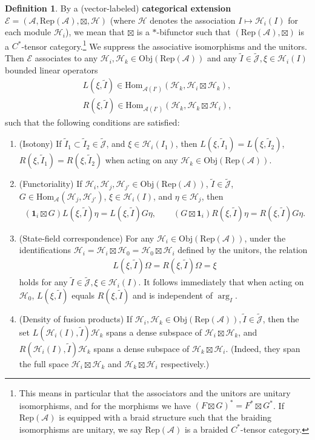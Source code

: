 \documentclass[12pt,a4paper,notitlepage]{article}
\theoremstyle{definition}
\newtheorem{df}{Definition}[section]
\theoremstyle{plain}
\newcommand{\fk}{\mathfrak}
\newcommand{\mc}{\mathcal}
\newcommand{\wtd}{\widetilde}
\newcommand{\id}{\mathbf{1}}
\newcommand{\Hom}{\mathrm{Hom}}
\newcommand{\Rep}{\mathrm{Rep}}
\newcommand{\scr}{\mathscr}
\newcommand{\Jtd}{\widetilde{\mathcal J}}
\newcommand{\RepA}{\mathrm{Rep}(\mathcal A)}
\newcommand{\Obj}{\mathrm{Obj}}
\numberwithin{equation}{section}
\begin{document}
\begin{df}\label{lb23}
By a (vector-labeled) \textbf{categorical extension} $\scr E=(\mc A,\Rep(\mc A),\boxtimes,\mc H)$ (where $\mc H$ denotes the association $I\mapsto \mc H_i(I)$ for each module $\mc H_i$), we mean that $\boxtimes$ is a $*$-bifunctor such that $(\RepA,\boxtimes)$ is a  $C^*$-tensor category.\footnote{This means in particular that the associators and the unitors are unitary isomorphisms, and for the morphisms we have $(F\boxtimes G)^*=F^*\boxtimes G^*$. If $\Rep(\mc A)$ is equipped with a braid structure such that the braiding isomorphisms are unitary, we say $\Rep(\mc A)$ is a braided $C^*$-tensor category.} We suppress the associative isomorphisms and the unitors.   Then $\scr E$ associates to any  $\mc H_i,\mc H_k\in\Obj(\Rep(\mc A))$ and any $\wtd I\in\Jtd,\fk \xi\in\mc H_i(I)$ bounded linear operators
\begin{gather*}
	L(\xi,\wtd I)\in\Hom_{\mc A(I')}(\mc H_k,\mc H_i\boxtimes\mc H_k),\\
	R(\xi,\wtd I)\in\Hom_{\mc A(I')}(\mc H_k,\mc H_k\boxtimes\mc H_i),
\end{gather*}
such that the following conditions are satisfied:
\begin{enumerate}[label=(\alph*)]
\item (Isotony) If $\wtd I_1\subset\wtd I_2\in\Jtd$, and $\xi\in\mc H_i(I_1)$, then $L(\xi,\wtd I_1)=L(\xi,\wtd I_2)$, $R(\xi,\wtd I_1)=R(\xi,\wtd I_2)$ when acting on any  $\mc H_k\in\Obj(\Rep(\mc A))$.
\item (Functoriality) If $\mc H_i,\mc H_j,\mc H_{j'}\in\Obj(\RepA)$, $\wtd I\in\Jtd$, $G\in\Hom_{\mc A}(\mc H_j,\mc H_{j'})$,  $\xi\in\mc H_i(I)$, and $\eta\in\mc H_j$, then
\begin{align}
	(\id_i\boxtimes G)L(\xi,\wtd I)\eta=L(\xi,\wtd I)G\eta,\qquad (G\boxtimes \id_i)R(\xi,\wtd I)\eta=R(\xi,\wtd I)G\eta.
\end{align}
\item (State-field correspondence) For any $\mc H_i\in\Obj(\RepA)$, under the identifications $\mc H_i=\mc H_i\boxtimes\mc H_0=\mc H_0\boxtimes\mc H_i$ defined by the unitors, the relation
\begin{align}
	L(\xi,\wtd I)\Omega=R(\xi,\wtd I)\Omega=\xi\label{eq14}
\end{align}
holds for any $\wtd I\in\Jtd,\xi\in\mc H_i(I)$. It follows immediately that when acting on $\mc H_0$, $L(\xi,\wtd I)$ equals $R(\xi,\wtd I)$ and is independent of $\arg_I$.
\item (Density of fusion products) If $\mc H_i,\mc H_k\in\Obj(\RepA),\wtd I\in\Jtd$, then the set $L(\mc H_i(I),\wtd I)\mc H_k$ spans a dense subspace of $\mc H_i\boxtimes\mc H_k$, and $R(\mc H_i(I),\wtd I)\mc H_k$ spans a dense subspace of $\mc H_k\boxtimes\mc H_i$. (Indeed, they span the full space $\mc H_i\boxtimes\mc H_k$ and $\mc H_k\boxtimes\mc H_i$ respectively.)

\end{enumerate}
\end{df}
\end{document}
